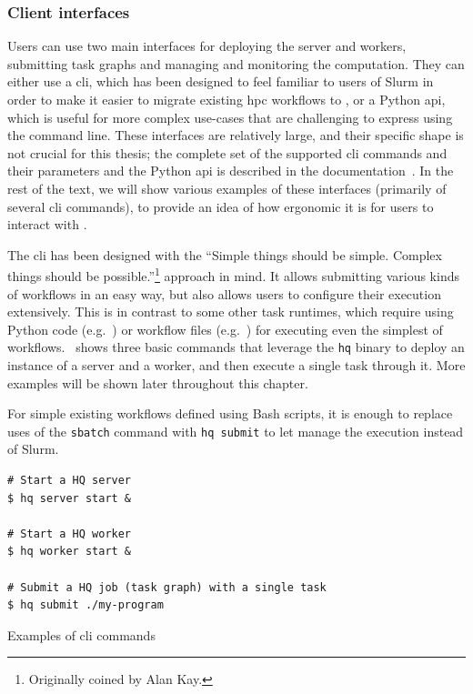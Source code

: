 \subsubsection*{Client interfaces}
Users can use two main interfaces for deploying the \hyperqueue{} server and workers,
submitting task graphs and managing and monitoring the computation. They can either use a
\gls{cli}, which has been designed to feel familiar to users of Slurm in order to
make it easier to migrate existing \gls{hpc} workflows to \hyperqueue{}, or
a Python \gls{api}, which is useful for more complex use-cases that are challenging
to express using the command line. These interfaces are relatively large, and their specific shape
is not crucial for this thesis; the complete set of the supported \gls{cli} commands
and their parameters and the Python \gls{api} is described in the
\hyperqueue{} documentation~\cite{hq_docs}. In the rest of the text, we will
show various examples of these interfaces (primarily of several \gls{cli} commands),
to provide an idea of how ergonomic it is for users to interact with \hyperqueue{}.

The \gls{cli} has been designed with the ``Simple things should be simple. Complex
things should be possible.''\footnote{Originally coined by Alan Kay.} approach in mind. It allows submitting various
kinds of workflows in an easy way, but also allows users to configure their execution extensively.
This is in contrast to some other task runtimes, which require using Python code (e.g.\
\dask{}) or workflow files (e.g.\ \snakemake{}) for executing even the
simplest of workflows.~\Autoref{lst:hq-cli-commands} shows three basic commands that leverage the
\texttt{hq} binary to deploy an instance of a \hyperqueue{} server and a
worker, and then execute a single task through it. More examples will be shown later throughout
this chapter.

For simple existing workflows defined using Bash scripts, it is enough to replace uses of the
\texttt{sbatch} command with \texttt{hq submit} to let \hyperqueue{} manage the execution
instead of Slurm.

\begin{listing}[h]
	\begin{verbatim}
# Start a HQ server
$ hq server start &

# Start a HQ worker
$ hq worker start &

# Submit a HQ job (task graph) with a single task
$ hq submit ./my-program
	\end{verbatim}
	\caption{Examples of \hyperqueue{} \gls{cli} commands}
	\label{lst:hq-cli-commands}
\end{listing}

